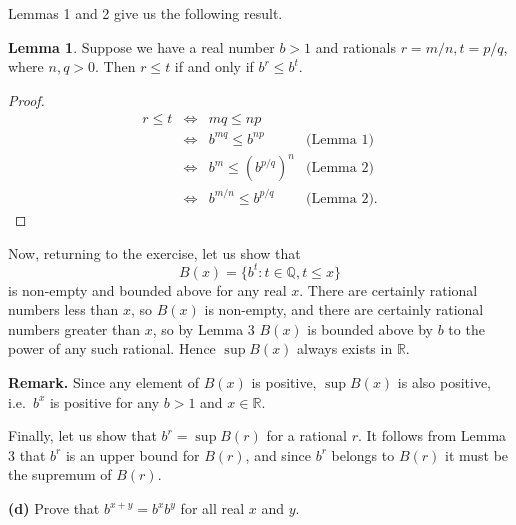 \documentclass[12pt]{article}
\newcommand{\newp}{\vspace{5mm}}
\theoremstyle{definition}
\newtheorem{lemma}{Lemma}
\begin{document}
Lemmas 1 and 2 give us the following result.

\begin{lemma}
Suppose we have a real number \( b > 1 \) and rationals \( r = m/n, t = p/q \), where \( n, q > 0 \). Then \( r\leq t \) if and only if \( b^r \leq b^t \).
\end{lemma}

\begin{proof}
\[
\begin{array}{rcll}
r \leq t & \iff & mq \leq np & \\
& \iff & b^{mq} \leq b^{np} & \text{(Lemma 1)} \\
& \iff & b^m \leq (b^{p/q})^n & \text{(Lemma 2)} \\
& \iff & b^{m/n} \leq b^{p/q} & \text{(Lemma 2).}
\end{array}
\]
\end{proof}

Now, returning to the exercise, let us show that
\[
    B(x) = \{ b^t : t \in \mathbb{Q}, t \leq x \}
\]
is non-empty and bounded above for any real \( x \). There are certainly rational numbers less than \( x \), so \( B(x) \) is non-empty, and there are certainly rational numbers greater than \( x \), so by Lemma 3 \( B(x) \) is bounded above by \( b \) to the power of any such rational. Hence \( \sup B(x) \) always exists in \( \mathbb{R} \).

\newp

\textbf{Remark.} Since any element of \( B(x) \) is positive, \( \sup B(x) \) is also positive, i.e.\ \( b^x \) is positive for any \( b > 1 \) and \( x \in \mathbb{R} \).

\newp

Finally, let us show that \( b^r = \sup B(r) \) for a rational \( r \). It follows from Lemma 3 that \( b^r \) is an upper bound for \( B(r) \), and since \( b^r \) belongs to \( B(r) \) it must be the supremum of \( B(r) \).

\newp

\textbf{(d)} Prove that \( b^{x + y} = b^x b^y \) for all real \( x \) and \( y \).

\newp
\end{document}
